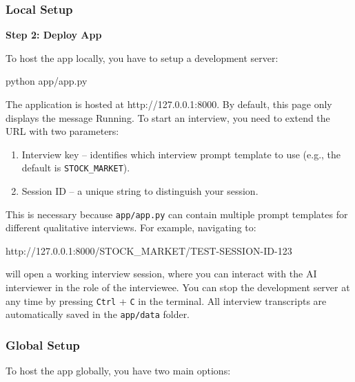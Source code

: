 \documentclass[
  letterpaper,
  DIV=11,
  numbers=noendperiod]{scrartcl}
\newenvironment{Shaded}{\begin{snugshade}}{\end{snugshade}}
\newcommand{\ExtensionTok}[1]{\textcolor[rgb]{0.00,0.23,0.31}{#1}}
\newcommand{\NormalTok}[1]{\textcolor[rgb]{0.00,0.23,0.31}{#1}}
\begin{document}
\subsubsection{Local Setup}\label{sec-replication-chopra-local}

\textbf{Step 2: Deploy App}

To host the app locally, you have to setup a development server:

\begin{Shaded}
\begin{Highlighting}[]
\ExtensionTok{python}\NormalTok{ app/app.py}
\end{Highlighting}
\end{Shaded}

The application is hosted at http://127.0.0.1:8000. By default, this
page only displays the message Running. To start an interview, you need
to extend the URL with two parameters:

\begin{enumerate}
\def\labelenumi{\arabic{enumi}.}
\item
  Interview key -- identifies which interview prompt template to use
  (e.g., the default is \texttt{STOCK\_MARKET}).
\item
  Session ID -- a unique string to distinguish your session.
\end{enumerate}

This is necessary because \texttt{app/app.py} can contain multiple
prompt templates for different qualitative interviews. For example,
navigating to:

\begin{Shaded}
\begin{Highlighting}[]
\NormalTok{http://127.0.0.1:8000/STOCK\_MARKET/TEST{-}SESSION{-}ID{-}123}
\end{Highlighting}
\end{Shaded}

will open a working interview session, where you can interact with the
AI interviewer in the role of the interviewee. You can stop the
development server at any time by pressing \texttt{Ctrl} + \texttt{C} in
the terminal. All interview transcripts are automatically saved in the
\texttt{app/data} folder.

\subsubsection{Global Setup}\label{sec-replication-chopra-global}

To host the app globally, you have two main options:
\end{document}
